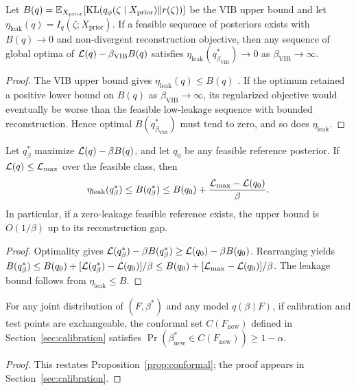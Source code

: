 \begin{proposition}
\label{prop:vib}
Let $B(q)=\mathbb{E}_{X_{\mathrm{prior}}}[\mathrm{KL}(q_\phi(\zeta\mid X_{\mathrm{prior}})\|r(\zeta))]$ be the VIB upper bound and let $\eta_{\mathrm{leak}}(q)=I_q(\zeta;X_{\mathrm{prior}})$. If a feasible sequence of posteriors exists with $B(q)\to0$ and non-divergent reconstruction objective, then any sequence of global optima of $\mathcal{L}(q)-\beta_{\mathrm{VIB}}B(q)$ satisfies $\eta_{\mathrm{leak}}(q^*_{\beta_{\mathrm{VIB}}})\to0$ as $\beta_{\mathrm{VIB}}\to\infty$.
\end{proposition}
\begin{proof}
The VIB upper bound gives $\eta_{\mathrm{leak}}(q)\le B(q)$ \citep{alemi2017vib}. If the optimum retained a positive lower bound on $B(q)$ as $\beta_{\mathrm{VIB}}\to\infty$, its regularized objective would eventually be worse than the feasible low-leakage sequence with bounded reconstruction. Hence optimal $B(q^*_{\beta_{\mathrm{VIB}}})$ must tend to zero, and so does $\eta_{\mathrm{leak}}$.
\end{proof}

\begin{corollary}
\label{cor:vib-finite}
Let $q^*_\beta$ maximize $\mathcal{L}(q)-\beta B(q)$, and let $q_0$ be any feasible reference posterior. If $\mathcal{L}(q)\le \mathcal{L}_{\max}$ over the feasible class, then
\[
\eta_{\mathrm{leak}}(q^*_\beta) \le B(q^*_\beta) \le B(q_0)+\frac{\mathcal{L}_{\max}-\mathcal{L}(q_0)}{\beta}.
\]
In particular, if a zero-leakage feasible reference exists, the upper bound is $O(1/\beta)$ up to its reconstruction gap.
\end{corollary}
\begin{proof}
Optimality gives $\mathcal{L}(q^*_\beta)-\beta B(q^*_\beta)\ge \mathcal{L}(q_0)-\beta B(q_0)$. Rearranging yields $B(q^*_\beta)\le B(q_0)+[\mathcal{L}(q^*_\beta)-\mathcal{L}(q_0)]/\beta\le B(q_0)+[\mathcal{L}_{\max}-\mathcal{L}(q_0)]/\beta$. The leakage bound follows from $\eta_{\mathrm{leak}}\le B$.
\end{proof}

\begin{proposition}
\label{prop:conformal-restated}
For any joint distribution of $(F,\beta^*)$ and any model $q(\beta\mid F)$, if calibration and test points are exchangeable, the conformal set $C(F_{\mathrm{new}})$ defined in Section~\ref{sec:calibration} satisfies $\Pr(\beta^*_{\mathrm{new}}\in C(F_{\mathrm{new}}))\ge 1-\alpha$.
\end{proposition}
\begin{proof}
This restates Proposition~\ref{prop:conformal}; the proof appears in Section~\ref{sec:calibration}.
\end{proof}

